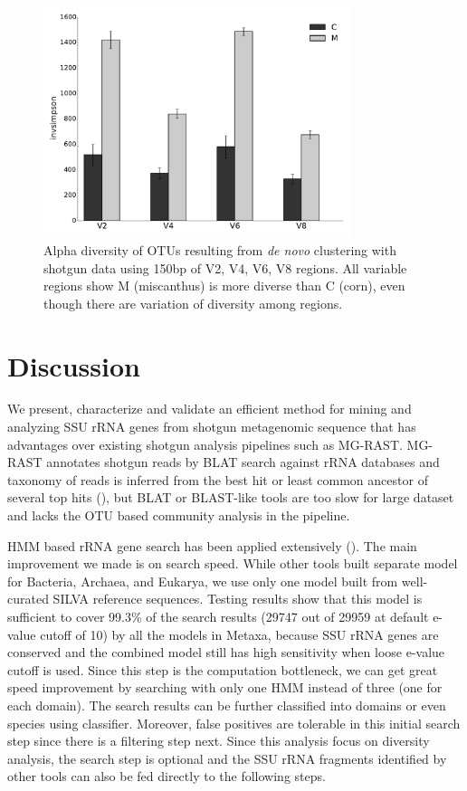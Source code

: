 \documentclass[12pt]{article}
\begin{document}
\begin{figure}[tbph!]
  \centering
  \includegraphics[width=0.8\textwidth]{figs/compare_vregion_alpha.pdf}
  \caption[Alpha diversity of OTUs resulting from {\em de novo} clustering with shotgun data using 150bp of V2, V4, V6, V8 regions]{Alpha diversity of OTUs resulting from {\em de novo} clustering with shotgun data using 150bp of V2, V4, V6, V8 regions. All variable regions show M (miscanthus) is more diverse than C (corn), even though there are variation of diversity among regions.}
  \label{fig:compare_vregion_alpha}
\end{figure}


\section{Discussion}
  We present, characterize and validate an efficient method for mining and analyzing SSU rRNA genes from shotgun metagenomic sequence that has advantages over existing shotgun analysis pipelines such as MG-RAST. MG-RAST annotates shotgun reads by BLAT search against rRNA databases and taxonomy of reads is inferred from the best hit or least common ancestor of several top hits (\cite{blast,blat,mgrast}), but BLAT or BLAST-like tools are too slow for large dataset and lacks the OTU based community analysis in the pipeline.

  HMM based rRNA gene search has been applied extensively (\cite{metarna,rrnaselector,metaxa}). The main improvement we made is on search speed. While other tools built separate model for Bacteria, Archaea, and Eukarya, we use only one model built from well-curated SILVA reference sequences. Testing results show that this model is sufficient to cover 99.3\% of the search results (29747 out of 29959 at default e-value cutoff of 10) by all the models in Metaxa, because SSU rRNA genes are conserved and the combined model still has high sensitivity when loose e-value cutoff is used. Since this step is the computation bottleneck, we can get great speed improvement by searching with only one HMM instead of three (one for each domain). The search results can be further classified into domains or even species using classifier. Moreover, false positives are tolerable in this initial search step since there is a filtering step next. Since this analysis focus on diversity analysis, the search step is optional and the SSU rRNA fragments identified by other tools can also be fed directly to the following steps.
\end{document}
